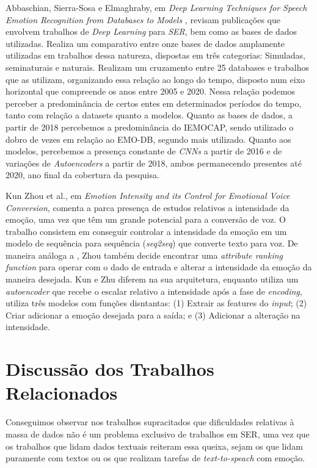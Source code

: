 Abbaschian, Sierra-Sosa e Elmaghraby, em \textit{Deep Learning Techniques for Speech Emotion Recognition from Databases to Models} \cite{32}, revisam publicações que envolvem trabalhos de \textit{Deep Learning} para \textit{SER}, bem como as bases de dados utilizadas. Realiza um comparativo entre onze bases de dados amplamente utilizadas em trabalhos dessa natureza, dispostas em três categorias: Simuladas, seminaturais e naturais. Realizam um cruzamento entre 25 databases e trabalhos que as utilizam, organizando essa relação ao longo do tempo, disposto num eixo horizontal que compreende os anos entre 2005 e 2020. Nessa relação podemos perceber a predominância de certos entes em determinados períodos do tempo, tanto com relação a datasets quanto a modelos. Quanto as bases de dados, a partir de 2018 percebemos a predominância do IEMOCAP, sendo utilizado o dobro de vezes em relação ao EMO-DB, segundo mais utilizado. Quanto aos modelos, percebemos a presença constante de \textit{CNNs} a partir de 2016 e de variações de \textit{Autoencoders} a partir de 2018, ambos permanecendo presentes até 2020, ano final da cobertura da pesquisa.

Kun Zhou et al., em \textit{Emotion Intensity and its Control for Emotional Voice Conversion}\cite{18}, comenta a parca presença de estudos relativos a intensidade da emoção, uma vez que têm um grande potencial para a conversão de voz. O trabalho consistem em conseguir controlar a intensidade da emoção em um modelo de sequência para sequência (\textit{seq2seq}) que converte texto para voz. De maneira análoga a \cite{63}, Zhou também decide encontrar uma \textit{attribute ranking function} para operar com o dado de entrada e alterar a intensidade da emoção da maneira desejada. Kun \cite{18} e Zhu \cite{63} diferem na sua arquitetura, enquanto \cite{63} utiliza um \textit{autoencoder} que recebe o escalar relativo a intensidade após a fase de \textit{encoding}, \cite{18} utiliza três modelos com funções disntantas: (1) Extrair as features do \textit{input}; (2) Criar adicionar a emoção desejada para a saída; e (3) Adicionar a alteração na intensidade.

\section{Discussão dos Trabalhos Relacionados}

Conseguimos observar nos trabalhos supracitados que dificuldades relativas à massa de dados não é um problema exclusivo de trabalhos em SER, uma vez que os trabalhos que lidam dados textuais reiteram essa queixa, sejam os que lidam puramente com textos ou os que realizam tarefas de \textit{text-to-speach} com emoção.

